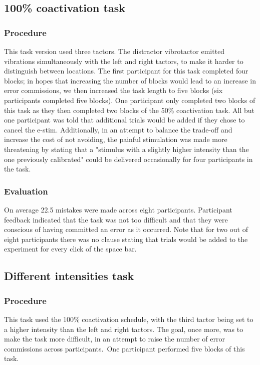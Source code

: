 \documentclass[twocolumn, serif, authordate, review]{jote-article}
\begin{document}
\subsection*{100\% coactivation task}
\gotoreview
\label{sec:co100}
\subsubsection*{Procedure}This task version used three tactors. The distractor vibrotactor emitted vibrations simultaneously with the left and right tactors, to make it harder to distinguish between locations. The first participant for this task completed four blocks; in hopes that increasing the number of blocks would lead to an increase in error commissions, we then increased the task length to five blocks (six participants completed five blocks). One participant only completed two blocks of this task as they then completed two blocks of the 50\% coactivation task. All but one participant was told that additional trials would be added if they chose to cancel the e-stim. Additionally, in an attempt to balance the trade-off and increase the cost of not avoiding, the painful stimulation was made more threatening by stating that a "stimulus with a slightly higher intensity than the one previously calibrated" could be delivered occasionally for four participants in the task.

\subsubsection*{Evaluation}On average 22.5 mistakes were made across eight participants. Participant feedback indicated that the task was not too difficult and that they were conscious of having committed an error as it occurred. Note that for two out of eight participants there was no clause stating that trials would be added to the experiment for every click of the space bar.~

{}
\subsection*{Different intensities task} 
\gotoreview
\label{sec:differentintensities}
\subsubsection*{Procedure}This task used the 100\% coactivation schedule, with the third tactor being set to a higher intensity than the left and right tactors. The goal, once more, was to make the task more difficult, in an attempt to raise the number of error commissions across participants.~One participant performed five blocks of this task.
\end{document}
